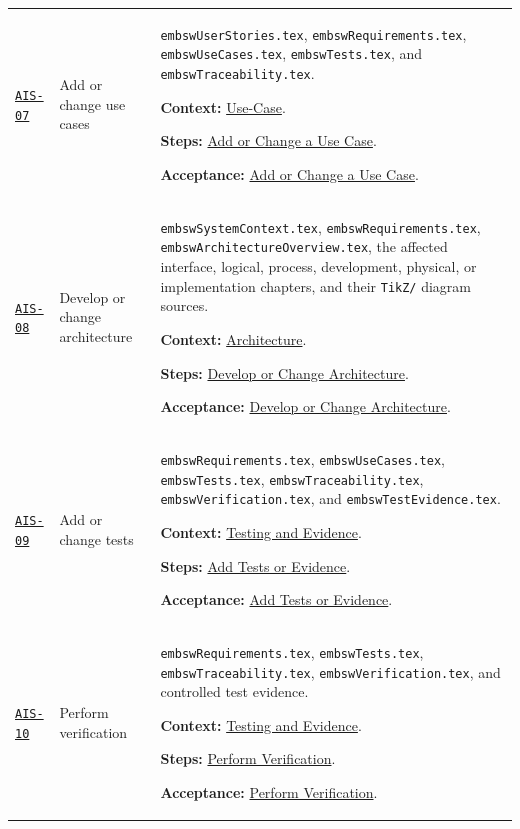 \begin{tabularx}{\linewidth}{L{1.6cm}L{3.1cm}Y}
\label{Skill:AIS-07}\hyperref[Section:AIUseCaseSteps]{\texttt{AIS-07}} & Add or change use cases & \texttt{embswUserStories.tex}, \texttt{embswRequirements.tex}, \texttt{embswUseCases.tex}, \texttt{embswTests.tex}, and \texttt{embswTraceability.tex}.\par\textbf{Context:} \hyperref[Section:AIUseCaseContext]{Use-Case}.\par\textbf{Steps:} \hyperref[Section:AIUseCaseTaskSteps]{Add or Change a Use Case}.\par\textbf{Acceptance:} \hyperref[Section:AIUseCaseAcceptance]{Add or Change a Use Case}.\\
\label{Skill:AIS-08}\hyperref[Section:AIArchitectureSteps]{\texttt{AIS-08}} & Develop or change architecture & \texttt{embswSystemContext.tex}, \texttt{embswRequirements.tex}, \texttt{embswArchitectureOverview.tex}, the affected interface, logical, process, development, physical, or implementation chapters, and their \texttt{TikZ/} diagram sources.\par\textbf{Context:} \hyperref[Section:AIArchitectureContext]{Architecture}.\par\textbf{Steps:} \hyperref[Section:AIArchitectureTaskSteps]{Develop or Change Architecture}.\par\textbf{Acceptance:} \hyperref[Section:AIArchitectureAcceptance]{Develop or Change Architecture}.\\
\label{Skill:AIS-09}\hyperref[Section:AITestSteps]{\texttt{AIS-09}} & Add or change tests & \texttt{embswRequirements.tex}, \texttt{embswUseCases.tex}, \texttt{embswTests.tex}, \texttt{embswTraceability.tex}, \texttt{embswVerification.tex}, and \texttt{embswTestEvidence.tex}.\par\textbf{Context:} \hyperref[Section:AITestingContext]{Testing and Evidence}.\par\textbf{Steps:} \hyperref[Section:AITestTaskSteps]{Add Tests or Evidence}.\par\textbf{Acceptance:} \hyperref[Section:AITestAcceptance]{Add Tests or Evidence}.\\
\label{Skill:AIS-10}\hyperref[Section:AIVerificationSteps]{\texttt{AIS-10}} & Perform verification & \texttt{embswRequirements.tex}, \texttt{embswTests.tex}, \texttt{embswTraceability.tex}, \texttt{embswVerification.tex}, and controlled test evidence.\par\textbf{Context:} \hyperref[Section:AITestingContext]{Testing and Evidence}.\par\textbf{Steps:} \hyperref[Section:AIVerificationTaskSteps]{Perform Verification}.\par\textbf{Acceptance:} \hyperref[Section:AIVerificationAcceptance]{Perform Verification}.\\

\end{tabularx}
